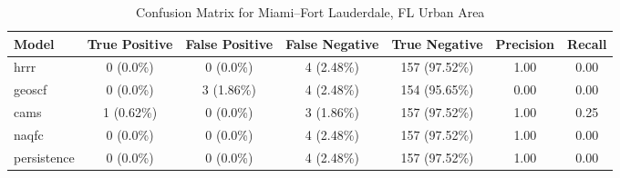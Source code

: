 \begin{table}[h!]
\centering
\begin{tabular}{lcccccc}
\hline
Model & True Positive & False Positive & False Negative & True Negative & Precision & Recall\\ \hline
hrrr & 0 (0.0\%) & 0 (0.0\%) & 4 (2.48\%) & 157 (97.52\%) & \cellcolor{green!25}1.00 & \cellcolor{green!25}0.00 \\ 
geoscf & 0 (0.0\%) & 3 (1.86\%) & 4 (2.48\%) & 154 (95.65\%) & \cellcolor{red!25}0.00 & \cellcolor{green!25}0.00 \\ 
cams & 1 (0.62\%) & 0 (0.0\%) & 3 (1.86\%) & 157 (97.52\%) & \cellcolor{green!25}1.00 & \cellcolor{green!25}0.25 \\ 
naqfc & 0 (0.0\%) & 0 (0.0\%) & 4 (2.48\%) & 157 (97.52\%) & \cellcolor{green!25}1.00 & \cellcolor{green!25}0.00 \\ 
persistence & 0 (0.0\%) & 0 (0.0\%) & 4 (2.48\%) & 157 (97.52\%) & 1.00 & 0.00 \\ 
\hline
\end{tabular}
\caption{Confusion Matrix for Miami--Fort Lauderdale, FL Urban Area}
\end{table}
